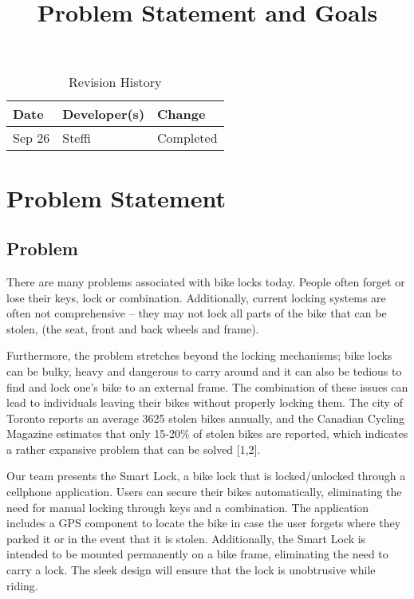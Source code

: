 \documentclass{article}
\title{Problem Statement and Goals\\\progname}
\author{\authname}
\date{}
\begin{document}
\maketitle

\begin{table}[hp]
\caption{Revision History} \label{TblRevisionHistory}
\begin{tabularx}{\textwidth}{llX}
\toprule
\textbf{Date} & \textbf{Developer(s)} & \textbf{Change}\\
\midrule
Sep 26 & Steffi & Completed\\
\bottomrule
\end{tabularx}
\end{table}

\section{Problem Statement}


\subsection{Problem}

There are many problems associated with bike locks today.  People often forget or lose their keys, lock or combination.  Additionally, current locking systems are often not comprehensive – they may not lock all parts of the bike that can be stolen, (the seat, front and back wheels and frame). 

Furthermore, the problem stretches beyond the locking mechanisms; bike locks can be bulky, heavy and dangerous to carry around and it can also be tedious to find and lock one’s bike to an external frame.  The combination of these issues can lead to individuals leaving their bikes without properly locking them.  The city of Toronto reports an average 3625 stolen bikes annually, and the Canadian Cycling Magazine estimates that only 15-20\% of stolen bikes are reported, which indicates a rather expansive problem that can be solved [1,2]. 

Our team presents the Smart Lock, a bike lock that is locked/unlocked through a cellphone application.  Users can secure their bikes automatically, eliminating the need for manual locking through keys and a combination.  The application includes a GPS component to locate the bike in case the user forgets where they parked it or in the event that it is stolen.  Additionally, the Smart Lock is intended to be mounted permanently on a bike frame, eliminating the need to carry a lock.  The sleek design will ensure that the lock is unobtrusive while riding. 
\end{document}
